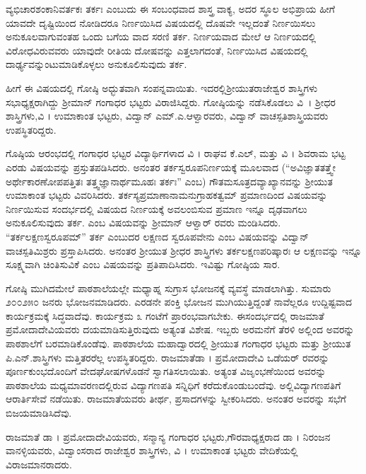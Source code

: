 {ವ್ಯಭಿಚಾರಶಂಕಾನಿವರ್ತಕಃ ತರ್ಕಃ ಎಂಬುದು ಈ ಸಂಬಂಧವಾದ ಶಾಸ್ತ್ರ ವಾಕ್ಯ, ಅದರ ಸ್ಥೂಲ ಅಭಿಪ್ರಾಯ ಹೀಗೆ \enginline{-} ಯಾವದೇ ದೃಷ್ಟಿಯಿಂದ ನೋಡಿದರೂ ನಿರ್ಣಯಿ\-ಸಿದ ವಿಷಯದಲ್ಲಿ ದೊಷವೇ ಇಲ್ಲದಂತೆ ನಿರ್ಣಯಿಸಲು ಅನುಕೂಲವಾಗುವಂತಹ ಒಂದು ಬಗೆಯ ವಾದ ಸರಣಿ \enginline{-} ತರ್ಕ. ನಿರ್ಣಯವಾದ ಮೇಲೆ ಆ ನಿರ್ಣಯದಲ್ಲಿ ವಿರೋಧವಿರುವವರು ಯಾವುದೇ ರೀತಿಯ ದೋಷವನ್ನು ಎತ್ತಲಾಗದಂತೆ, ನಿರ್ಣಯಿಸಿದ ವಿಷಯದಲ್ಲಿ ದಾರ್ಢ್ಯವನ್ನುಂಟುಮಾಡಿಕೊಳ್ಳಲು ಅನುಕೂಲಿಸುವುದು ತರ್ಕ.

ಹೀಗೆ ಈ ವಿಷಯದಲ್ಲಿ ಗೋಷ್ಠಿ ಅಧ್ಭುತವಾಗಿ ಸಂಪನ್ನವಾಯಿತು. ಇದರಲ್ಲಿ\break ಶ್ರೀಯುತರಾಜೇಶ್ವರ ಶಾಸ್ತ್ರಿಗಳು ಸಭಾಧ್ಯಕ್ಷರಾಗಿದ್ದು ಶ್ರೀಮಾನ್ ಗಂಗಾಧರ ಭಟ್ಟರು ವಿರಾಜಿಸಿದ್ದರು. ಗೋಷ್ಠಿಯನ್ನು ನಡೆಸಿಕೊಡಲು ವಿ~। ಶ್ರೀಧರ ಶಾಸ್ತ್ರಿಗಳು,\break ವಿ । ಉಮಾಕಾಂತ ಭಟ್ಟರು, ವಿದ್ವಾನ್ ಎಮ್.ಎ.ಆಳ್ವಾರವರು, ವಿದ್ವಾನ್ ವಾಚಸ್ಪತಿ\break ಶಾಸ್ತ್ರಿಯವರು ಉಪಸ್ಥಿತರಿದ್ದರು. 

ಗೊಷ್ಠಿಯ ಆರಂಭದಲ್ಲಿ ಗಂಗಾಧರ ಭಟ್ಟರ ವಿದ್ಯಾರ್ಥಿಗಳಾದ ವಿ । ರಾಘವ ಕೆ.ಎಲ್, ಮತ್ತು ವಿ । ಶಿವರಾಮ ಭಟ್ಟ ಎರಡು ವಿಷಯವನ್ನು ಪ್ರಸ್ತುತಪಡಿಸಿದರು. ಅನಂತರ ತರ್ಕಸ್ವರೂಪನಿರ್ಣಯಕ್ಕೆ  ಮೂಲವಾದ (“ಅವಿಜ್ಞಾತತತ್ತ್ವೇ ಅರ್ಥೇ\break ಕಾರಣೋಪಪತ್ತಿತಃ ತತ್ತ್ವಜ್ಞಾನಾರ್ಥಮೂಹಃ ತರ್ಕಃ” ಎಂಬ) ಗೌತಮಸೂತ್ರದ\break ವ್ಯಾಖ್ಯಾನವನ್ನು ಶ್ರೀಯುತ ಉಮಾಕಾಂತ ಭಟ್ಟರು ವಿವರಿಸಿದರು. ತರ್ಕಸ್ಯ\break ಪ್ರಮಾಣಾನಾಮನುಗ್ರಾಹಕತ್ವಮ್ \enginline{-} ಪ್ರಮಾಣದಿಂದ ವಿಷಯವನ್ನು ನಿರ್ಣಯಿಸುವ ಸಂದರ್ಭದಲ್ಲಿ ವಿಷಯದ  ನಿರ್ಣಯಕ್ಕೆ ಅವಲಂಬಿಸುವ ಪ್ರಮಾಣ ಇನ್ನೂ ದೃಢ\-ವಾಗಲು ಅನುಕೂಲಿಸುವುದು ತರ್ಕ. ಎಂಬ ವಿಷಯವನ್ನು ಶ್ರೀಮಾನ್ ಆಳ್ವಾರ್ ರವರು ಮಂಡಿಸಿದರು. “ತರ್ಕಲಕ್ಷಣಸ್ವರೂಪಮ್” \enginline{-} ತರ್ಕ ಎಂಬುದರ ಲಕ್ಷಣದ ಸ್ವರೂಪವೇನು ಎಂಬ ವಿಷಯವನ್ನು ವಿದ್ವಾನ್ ವಾಚಸ್ಪತಿಮಿಶ್ರರು ಪ್ರಸ್ತಾಪಿಸಿದರು. ಅನಂತರ ಶ್ರೀಯುತ ಶ್ರೀಧರ ಶಾಸ್ತ್ರಿಗಳು ತರ್ಕಲಕ್ಷಣಪರಿಷ್ಕಾರಃ ಆ ಲಕ್ಷಣವನ್ನು ಇನ್ನೂ ಸೂಕ್ಷ್ಮವಾಗಿ ಚಿಂತಿಸುವಿಕೆ ಎಂಬ ವಿಷಯವನ್ನು ಪ್ರತಿಪಾದಿಸಿದರು. ಇವಿಷ್ಟು ಗೋಷ್ಠಿಯ ಸಾರ.
\eject

ಗೋಷ್ಠಿ ಮುಗಿದಮೇಲೆ ಪಾಠಶಾಲೆಯಲ್ಲೇ ಮಧ್ಯಾಹ್ನ ಸುಗ್ರಾಸ ಭೋಜನಕ್ಕೆ ವ್ಯವಸ್ಥೆ ಮಾಡಲಾಗಿತ್ತು. ಸುಮಾರು ೨೦೦\enginline{-}೨೫೦ ಜನರು  ಭೋಜನಮಾಡಿದರು. ಎರಡನೇ ಪಂಕ್ತಿ ಭೋಜನ ಮುಗಿಯುತ್ತಿದ್ದಂತೆ ನಾವೆಲ್ಲರೂ ಉದ್ದಿಷ್ಟವಾದ ಕಾರ್ಯ\-ಕ್ರಮಕ್ಕೆ ಸಿದ್ಧವಾದೆವು. ಕಾರ್ಯಕ್ರಮ ೩ ಗಂಟೆಗೆ ಪ್ರಾರಂಭವಾಗಬೇಕು. ಈ\break ಸಂದರ್ಭದಲ್ಲಿ ರಾಜಮಾತೆ ಪ್ರಮೋದಾದೇವಿಯವರು ದಯಮಾಡಿಸುತ್ತಿರುವುದು ಅತ್ಯಂತ ವಿಶೇಷ. ಇಬ್ಬರು ಅರಮನೆಗೆ ತೆರಳಿ ಅಲ್ಲಿಂದ  ಅವರನ್ನು ಪಾಠಶಾಲೆಗೆ ಬರ\-ಮಾಡಿ\-ಕೊಂಡೆವು. ಪಾಠಶಾಲೆಯ ಮಹಾದ್ವಾರದಲ್ಲಿ ಶ್ರೀಯುತ ಗಂಗಾಧರ ಭಟ್ಟರು ಮತ್ತು ಶ್ರೀಯುತ ಪಿ.ಎನ್.ಶಾಸ್ತ್ರಿಗಳು ಮತ್ತಿತರರೆಲ್ಲ ಉಪಸ್ಥಿತರಿದ್ದರು. ರಾಜಮಾತೆ\break ಡಾ । ಪ್ರಮೋದಾದೇವಿ ಒಡೆಯರ್ ರವರನ್ನು ಪೂರ್ಣಕುಂಭದೊಂದಿಗೆ ವೇದಘೋಷಗಳೊಡನೆ ಸ್ವಾಗತಿಸಲಾಯಿತು. ಅತ್ಯಂತ ವಿಜೃಂಭಣೆಯಿಂದ ಅವರನ್ನು ಪಾಠಶಾಲೆಯ ಮಧ್ಯಮಾವರಣದಲ್ಲಿರುವ ವಿದ್ಯಾಗಣಪತಿ ಸನ್ನಿಧಿಗೆ ಕರೆದುಕೊಂಡುಬಂದೆವು. ಅಲ್ಲಿ\break ವಿದ್ಯಾಗಣಪತಿಗೆ ಆರಾರ್ತಿಸೇವೆ ನಡೆಯಿತು. ರಾಜಮಾತೆಯವರು ತೀರ್ಥ, ಪ್ರಸಾದಗಳನ್ನು ಸ್ವೀಕರಿಸಿದರು. ಅನಂತರ ಅವರನ್ನು ಸಭೆಗೆ ಬಿಜಯಮಾಡಿಸಿದೆವು. 

ರಾಜಮಾತೆ ಡಾ । ಪ್ರಮೋದಾದೇವಿಯವರು, ಸನ್ಮಾನ್ಯ ಗಂಗಾಧರ ಭಟ್ಟರು,\break ಗೌರವಾಧ್ಯಕ್ಷರಾದ ಡಾ । ನಿರಂಜನ ವಾನಳ್ಳಿಯವರು, ವಿದ್ವಾಂಸರಾದ ರಾಜೇಶ್ವರ ಶಾಸ್ತ್ರಿಗಳು, ವಿ । ಉಮಾಕಾಂತ ಭಟ್ಟರು ವೇದಿಕೆಯಲ್ಲಿ ವಿರಾಜಮಾನರಾದರು.

}
